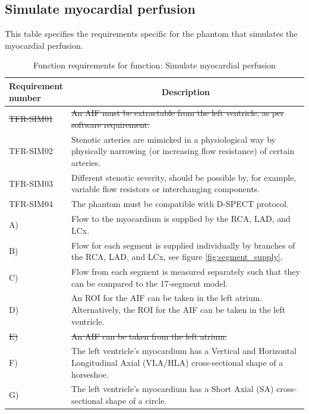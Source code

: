 \subsection{Simulate myocardial perfusion}
\begin{table} [H]
\caption{Function requirements for function: Simulate myocardial perfusion}
\label{tab:funcsim}
This table specifies the requirements specific for the phantom that simulates the myocardial perfusion.
\begin{tabular}{l|p{120mm}|}
	\makecell[l]{\textbf{Requirement} \\  \textbf{number}} & \multicolumn{1}{c}{\textbf{Description}}\\
	\hline
	\sout{TFR-SIM01} & \sout{An \ac{AIF} must be extractable from the left ventricle, as per software requirement.}\\
	TFR-SIM02 & Stenotic arteries are mimicked in a physiological way by physically narrowing (or increasing flow resistance) of certain arteries. \\
	TFR-SIM03 & Different stenotic severity, should be possible by, for example, variable flow resistors or interchanging components. \\
	TFR-SIM04 & The phantom must be compatible with D-SPECT protocol. \\
	\hspace{1.5cm} A) & Flow to the myocardium is supplied by the RCA, LAD, and LCx. \\
	\hspace{1.5cm} B) & Flow for each segment is supplied individually by branches of the RCA, LAD, and LCx, see figure \ref{fig:segment_supply}. \\
	\hspace{1.5cm} C) & Flow from each segment is measured separately such that they can be compared to the 17-segment model. \\
	\hspace{1.5cm} D) & An ROI for the AIF can be taken in the left atrium. Alternatively, the ROI for the AIF can be taken in the left ventricle. \\
	\hspace{1.5cm} \sout{E)} & \sout{An AIF can be taken from the left atrium.} \\
	\hspace{1.5cm} F) & The left ventricle's myocardium has a Vertical and Horizontal Longitudinal Axial (VLA/HLA) cross-sectional shape of a horseshoe. \\
	\hspace{1.5cm} G) & The left ventricle's myocardium has a Short Axial (SA) cross-sectional shape of a circle. \\

\end{tabular}
\end{table}
